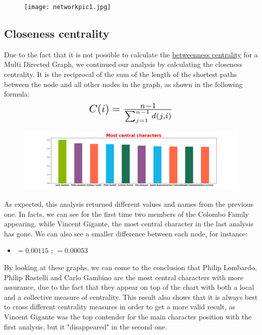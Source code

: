 \documentclass{article}
\begin{document}
\begin{figure}[t!]
\vspace{-250pt}
\centering
\texttt{[image: networkpic1.jpg]}
\advance\leftskip-3.52cm
\end{figure}



\textcolor{Titoli}{\subsection{Closeness centrality}}
Due to the fact that it is not possible to calculate the \href{https://en.wikipedia.org/wiki/Betweenness_centrality}{betweenness centrality} for a Multi Directed Graph, we continued our analysis by calculating the closeness centrality. It is the reciprocal of the sum of the length of the shortest paths between the node and all other nodes in the graph, as shown in the following formula:
\begin{equation*}
    \scalebox{1.5}{$C(i) = \frac{n-1}{\sum_{j=1}^{n-1}d(j,i)}$}
\end{equation*}



\begin{figure}[h!]
\vspace{-20pt}
\centering
\advance\leftskip-5cm
\includegraphics[width=675pt]{closeness.jpeg}
\end{figure}



\noindent
As expected, this analysis returned different values and names from the previous one. In facts, we can see for the first time two members of the Colombo Family appearing, while Vincent Gigante, the most central character in the last analysis has gone. We can also see a smaller difference between each node, for instance:
\begin{itemize}
    \item {}$= 0.00115$ ; $= 0.00053$
\end{itemize}
By looking at these graphs, we can come to the conclusion that Philip Lombardo, Philip Rastelli and Carlo Gambino are the most central characters with more assurance, due to the fact that they appear on top of the chart with both a local and a collective measure of centrality. This result also shows that it is always best to cross different centrality measures in order to get a more valid result, as Vincent Gigante was the top contender for the main character position with the first analysis, but it "disappeared" in the second one.
\end{document}

